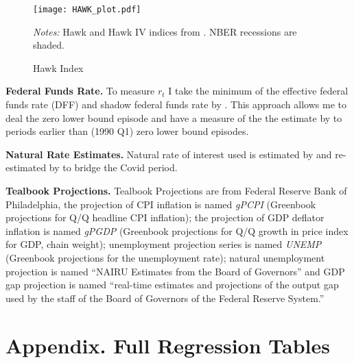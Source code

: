 \documentclass[11pt]{article}
\begin{document}
\begin{figure}[hbtp]\centering
  \begin{minipage}{0.6\textwidth}\centering
  \caption{Hawk Index}
  \texttt{[image: HAWK\_plot.pdf]}
  \begin{flushleft}\scriptsize
    \textit{Notes:} Hawk and Hawk IV indices from \citet{HIM2023}. NBER recessions are shaded.
  \end{flushleft}
\end{minipage}
\end{figure}


\noindent\textbf{Federal Funds Rate.}
To measure $r_t$ I take the minimum of the effective federal funds rate (DFF) and shadow federal funds rate by \citet{WuXia2016}. This approach allows me to deal the zero lower bound episode and have a measure of the the estimate by \citet{WuXia2016} to periods earlier than (1990 Q1) zero lower bound episodes. 

\noindent\textbf{Natural Rate Estimates.}
Natural rate of interest used is estimated by \citet{LW2003} and re-estimated by \citet{HLW2023} to bridge the Covid period.

\noindent\textbf{Tealbook Projections.}  Tealbook Projections are from Federal Reserve Bank of Philadelphia, the projection of CPI inflation is named \emph{gPCPI} (Greenbook projections for Q/Q headline CPI inflation); 
the projection of GDP deflator inflation is named \emph{gPGDP} (Greenbook projections for Q/Q growth in price index for GDP, chain weight); 
unemployment projection series is named \emph{UNEMP} (Greenbook projections for the unemployment rate); 
natural unemployment projection is named ``NAIRU Estimates from the Board of Governors'' and 
GDP gap projection is named ``real-time estimates and projections of the output gap used by the staff of the Board of Governors of the Federal Reserve System.''



\newpage

\section{Appendix. Full Regression Tables}
\end{document}
